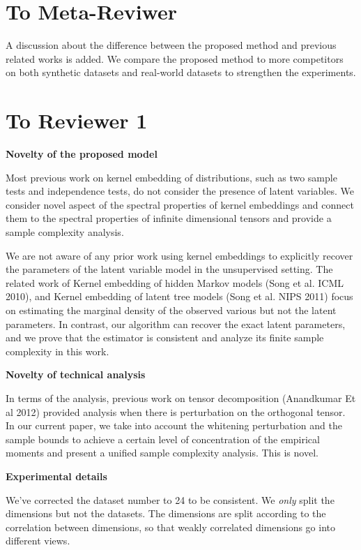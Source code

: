 \documentclass{article}
\begin{document}
\section*{To Meta-Reviwer}
A discussion about the difference between the proposed method and previous related works is added. We compare the proposed method to more competitors on both synthetic datasets and real-world datasets to strengthen the experiments.

\section*{To Reviewer 1}

\textbf{Novelty of the proposed model}

Most previous work on kernel embedding of distributions, such as two sample tests and independence tests, do not consider the presence of latent variables. We consider novel aspect of the spectral properties of kernel embeddings and connect them to the spectral properties of infinite dimensional tensors and provide a sample complexity analysis.

We are not aware of any prior work using kernel embeddings to explicitly recover the parameters of the latent variable model in the unsupervised setting. The related work of Kernel embedding of hidden Markov models (Song et al. ICML 2010), and Kernel embedding of latent tree models (Song et al. NIPS 2011) focus on estimating the marginal density of the observed various but not the latent parameters. In contrast, our algorithm can recover the exact latent parameters, and we prove that the estimator is consistent and analyze its finite sample complexity in this work.

\textbf{Novelty of technical analysis}

In terms of the analysis, previous work on tensor decomposition (Anandkumar Et al 2012) provided analysis when there is perturbation on the orthogonal tensor. In our current paper, we take into account the whitening perturbation and the sample bounds to achieve a certain level of concentration of the empirical moments and present a unified sample complexity analysis. This is novel.

\textbf{Experimental details}

We've corrected the dataset number to 24 to be consistent. We \emph{only} split the dimensions but not the datasets. The dimensions are split according to the correlation between dimensions, so that weakly correlated dimensions go into different views.
\end{document}
